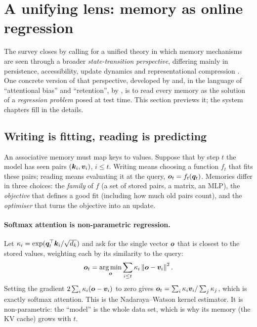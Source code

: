 \section{A unifying lens: memory as online regression}\label{sec:c02-unify}

The survey closes by calling for a unified theory in which memory mechanisms are seen through a
broader \emph{state-transition perspective}, differing mainly in persistence, accessibility, update
dynamics and representational compression \citep[\S VI-A]{zhoubian2026memory}. One concrete
version of that perspective, developed by \citet{c02-wang2025regression} and, in the language of
``attentional bias'' and ``retention'', by \citet{c02-behrouz2025miras}, is to read every memory as
the solution of a \emph{regression problem} posed at test time. This section previews it; the
system chapters fill in the details.

\subsection{Writing is fitting, reading is predicting}

An associative memory must map keys to values. Suppose that by step $t$ the model has seen pairs
$(\bm{k}_i, \bm{v}_i)$, $i \le t$. Writing means choosing a function $f_t$ that fits these pairs; reading
means evaluating it at the query, $\bm{o}_t = f_t(\bm{q}_t)$. Memories differ in three choices: the
\emph{family} of $f$ (a set of stored pairs, a matrix, an MLP), the \emph{objective} that defines a
good fit (including how much old pairs count), and the \emph{optimiser} that turns the objective
into an update.

\paragraph{Softmax attention is non-parametric regression.} Let
$\kappa_i = \exp(\bm{q}_t^{\top}\bm{k}_i/\sqrt{d_k})$ and ask for the single vector $\bm{o}$ that is closest to
the stored values, weighting each by its similarity to the query:
\begin{equation}\label{eq:c02-nw}
  \bm{o}_t = \operatorname*{arg\,min}_{\bm{o}}\sum_{i \le t}\kappa_i\left\lVert \bm{o} - \bm{v}_i\right\rVert^2 .
\end{equation}
Setting the gradient $2\sum_i\kappa_i(\bm{o} - \bm{v}_i)$ to zero gives
$\bm{o}_t = \sum_i\kappa_i\bm{v}_i/\sum_j\kappa_j$, which is exactly softmax attention. This is the
Nadaraya--Watson kernel estimator. It is non-parametric: the ``model'' is the whole data set, which
is why its memory (the KV cache) grows with $t$.

